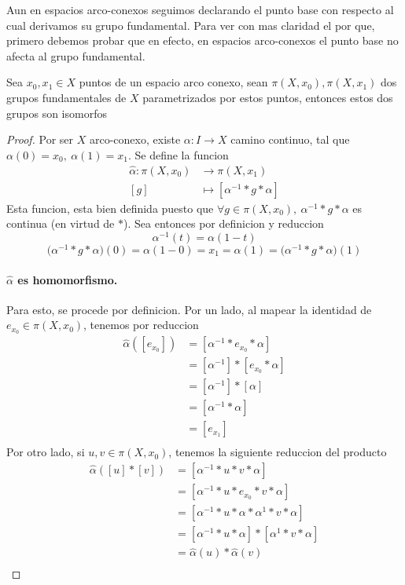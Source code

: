 {Aun en espacios arco-conexos seguimos declarando el punto base con
respecto al cual derivamos su grupo fundamental. Para ver con mas
claridad el por que, primero debemos probar que en efecto, en espacios
arco-conexos el punto base no afecta al grupo fundamental.
\begin{teorema} \label{not:alpha-hat}
  Sea \(x_0 , x_1 \in X\) puntos de un espacio arco conexo, sean \(\pi
  (X, x_0), \pi (X, x_1)\) dos grupos fundamentales de \(X\)
  parametrizados por estos puntos, entonces estos dos grupos son isomorfos
\end{teorema}
\begin{proof}
  Por ser \(X\) arco-conexo, existe \(\alpha : I \to X\) camino
  continuo, tal que \(\alpha (0) = x_0,\ \alpha (1) = x_1\). Se define
  la funcion
  \begin{align*}
    \hat \alpha : \pi (X, x_0) &\to \pi (X, x_1) \\
    [g] &\mapsto [ \alpha^{-1} * g * \alpha ]
  \end{align*}
  Esta funcion, esta bien definida puesto que \(\forall g \in \pi (X,
  x_0),\ \alpha^{-1} * g * \alpha \) es continua (en virtud de \(*\)).
  Sea entonces por definicion y reduccion
  \[ \alpha^{-1} (t) = \alpha (1 - t)\]
  \[\big(\alpha^{-1} * g * \alpha \big) (0) = \alpha (1 - 0) = x_1 = \alpha (1) =
    \big(\alpha^{-1} * g * \alpha \big) (1)\]

  \paragraph{\(\hat \alpha\) es homomorfismo.} Para esto, se procede por
  definicion. Por un lado, al mapear la identidad de \(e_{x_0} \in \pi
  (X, x_0) \), tenemos por reduccion
  \begin{align*}
    \hat \alpha ([e_{x_0}])
                 &= [\alpha^{-1} * e_{x_0} * \alpha] \\
                 &= [\alpha^{-1}] * [e_{x_0} * \alpha] \\
                 &= [\alpha^{-1}] * [\alpha] \\
                 &= [\alpha^{-1} * \alpha] \\
                 &= [e_{x_1}] \\
  \end{align*}
  Por otro lado, si \(u,v \in \pi (X, x_0) \), tenemos la siguiente
  reduccion del producto
  \begin{align*}
    \hat \alpha ([u] * [v]) &= [\alpha^{-1} * u * v * \alpha] \\
    &= [\alpha^{-1} * u * e_{x_0} * v * \alpha] \\
    &= [\alpha^{-1} * u * \alpha * \alpha^{1} * v * \alpha] \\
    &= [\alpha^{-1} * u * \alpha ] * [ \alpha^{1} * v * \alpha] \\
    &= \hat \alpha (u) * \hat \alpha (v) \\
  \end{align*}


\end{proof}}
